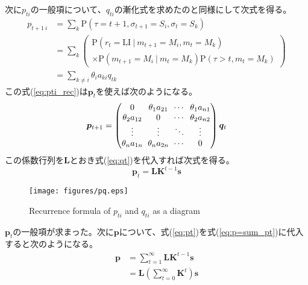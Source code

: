 \documentclass{jarticle}
\numberwithin{equation}{section}
\numberwithin{table}{section}
\theoremstyle{plain}
\begin{document}
次に$ p_{t i} $の一般項について、$ q_{t i} $の漸化式を求めたのと同様にして次式を得る。
\begin{align}
    p_{t+1\ i} & = \! \sum_{k} \mathrm{P}(\tau = t + 1 , \sigma_{t+1} = S_i , \sigma_t = S_k) \nonumber\\
    & = \! \sum_{k} \left(
        \begin{array}{l}
            \mathrm{P}(r_t = \mathrm{LI}\ |\ m_{t+1} \! = \! M_i , m_t \! = \! M_k) \\
            \times \mathrm{P}(m_{t+1} \! = \! M_i\ |\ m_t \! = \! M_k) \mathrm{P}(\tau \! > \! t , m_t \! = \! M_k)
        \end{array}
    \right) \nonumber\\
    & = \! \sum_{k \ne i} \theta_i a_{k i} q_{t k}
    \label{eq:pti_rec}
\end{align}
この式(\ref{eq:pti_rec})は$ \bm{p}_t $を使えば次のようになる。
\begin{equation}
    \arraycolsep3pt
    \bm{p}_{t + 1} = 
    \begin{pmatrix}
        0 & \theta_1 a_{2 1} & \cdots & \theta_1 a_{n 1} \\
        \theta_2 a_{1 2} & 0 & \cdots & \theta_2 a_{n 2} \\
        \vdots & \vdots & \ddots & \vdots \\
        \theta_n a_{1 n} & \theta_n a_{2 n} & \cdots & 0 \\
    \end{pmatrix}
    \bm{q}_t
\end{equation}
この係数行列を$ \bm{L} $とおき式(\ref{eq:qt})を代入すれば次式を得る。
\begin{equation} \label{eq:pt}
    \bm{p}_t = \bm{L} \bm{K}^{t - 1} \bm{s}
\end{equation}

\begin{figure}[bt]
    \centering
    \texttt{[image: figures/pq.eps]}
    \caption{Recurrence formula of $ p_{t i} $ and $ q_{t i} $ as a diagram}
\end{figure}

$ \bm{p}_t $の一般項が求まった。次に$ \bm{p} $について、式(\ref{eq:pt})を式(\ref{eq:p=sum_pt})に代入すると次のようになる。
\begin{align}
    \bm{p} &= \sum_{t=1}^{\infty} \bm{L} \bm{K}^{t - 1} \bm{s} \nonumber \\
    &= \bm{L} \left( \sum_{t=0}^{\infty} \bm{K}^t \right) \bm{s} \label{eq:p_}
\end{align}
\end{document}
